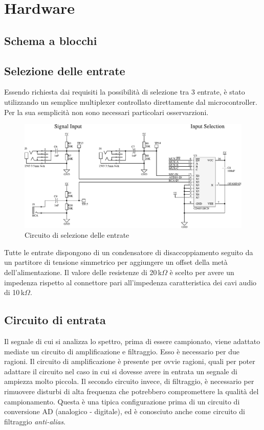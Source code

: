 \chapter{Hardware}
\section{Schema a blocchi}

\section{Selezione delle entrate}
Essendo richiesta dai requisiti la possibilit\`a di selezione tra 3 entrate,
\`e stato utilizzando un semplice multiplexer controllato direttamente dal
microcontroller. Per la sua semplicit\`a non sono necessari particolari
osservarzioni.

\begin{figure}[H] \centering
    \includegraphics[width=.8\linewidth]{figures/circuits/input-selection.pdf}
    \caption{Circuito di selezione delle entrate \label{fig:input-selection}}
\end{figure}

Tutte le entrate dispongono di un condensatore di disaccoppiamento seguito da
un partitore di tensione simmetrico per aggiungere un offset della met\`a
dell'alimentazione. Il valore delle resistenze di 20\,k\(\Omega\) \`e scelto
per avere un impedenza rispetto al connettore pari all'impedenza
caratteristica dei cavi audio di 10\,k\(\Omega\).

\section{Circuito di entrata}
Il segnale di cui si analizza lo spettro, prima di essere campionato, viene
adattato mediate un circuito di amplificazione e filtraggio. Esso \`e
necessario per due ragioni. Il circuito di amplificazione \`e presente per
ovvie ragioni, quali per poter adattare il circuito nel caso in cui si dovesse
avere in entrata un segnale di ampiezza molto piccola. Il secondo circuito
invece, di filtraggio, \`e necessario per rimuovere disturbi di alta frequenza
che potrebbero compromettere la qualit\`a del campionamento. Questa \`e una
tipica configurazione prima di un circuito di conversione AD (analogico -
digitale), ed \`e conosciuto anche come circuito di filtraggio
\emph{anti-alias}.

